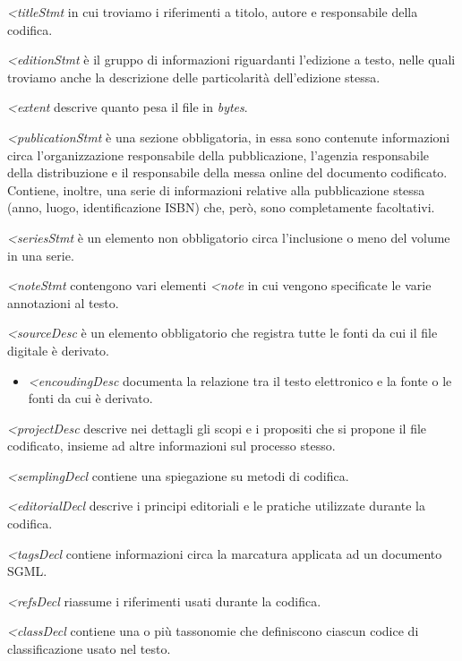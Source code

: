{\emph{\textless{}titleStmt} in cui troviamo i riferimenti
a titolo, autore e responsabile della codifica.

\emph{\textless{}editionStmt} è il gruppo di informazioni
riguardanti l'edizione a testo, nelle quali troviamo anche la
descrizione delle particolarità dell'edizione stessa.

\emph{\textless{}extent} descrive quanto pesa il file in
\emph{bytes}.

\emph{\textless{}publicationStmt} è una sezione
obbligatoria, in essa sono contenute informazioni circa l'organizzazione
responsabile della pubblicazione, l'agenzia responsabile della
distribuzione e il responsabile della messa online del documento
codificato. Contiene, inoltre, una serie di informazioni relative alla
pubblicazione stessa (anno, luogo, identificazione ISBN) che, però, sono
completamente facoltativi.

\emph{\textless{}seriesStmt} è un elemento non
obbligatorio circa l'inclusione o meno del volume in una serie.

\emph{\textless{}noteStmt} contengono vari elementi
\emph{\textless{}note} in cui vengono specificate le varie
annotazioni al testo.

\emph{\textless{}sourceDesc} è un elemento obbligatorio
che registra tutte le fonti da cui il file digitale è derivato.

\begin{itemize}
\item
  \emph{\textless{}encoudingDesc} documenta la relazione
  tra il testo elettronico e la fonte o le fonti da cui è derivato.
\end{itemize}

\emph{\textless{}projectDesc} descrive nei dettagli gli
scopi e i propositi che si propone il file codificato, insieme ad altre
informazioni sul processo stesso.

\emph{\textless{}semplingDecl} contiene una spiegazione su
metodi di codifica.

\emph{\textless{}editorialDecl} descrive i principi
editoriali e le pratiche utilizzate durante la codifica.

\emph{\textless{}tagsDecl} contiene informazioni circa la
marcatura applicata ad un documento SGML.

\emph{\textless{}refsDecl} riassume i riferimenti usati
durante la codifica.

\emph{\textless{}classDecl} contiene una o più tassonomie
che definiscono ciascun codice di classificazione usato nel testo.

}
